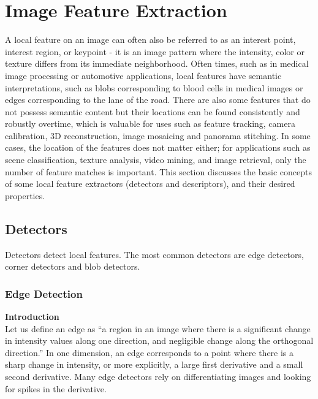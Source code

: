 \documentclass[twoside]{article}
\begin{document}



\section{Image Feature Extraction}

A local feature on an image can often also be referred to as an interest point, interest region, or keypoint - it is an image pattern where the intensity, color or texture differs from its immediate neighborhood. Often times, such as in medical image processing or automotive applications, local features have semantic interpretations, such as blobs corresponding to blood cells in medical images or edges corresponding to the lane of the road. There are also some features that do not possess semantic content but their locations can be found consistently and robustly overtime, which is valuable for uses such as feature tracking, camera calibration, 3D reconstruction, image mosaicing and panorama stitching. In some cases, the location of the features does not matter either; for applications such as scene classification, texture analysis, video mining, and image retrieval, only the number of feature matches is important. This section discusses the basic concepts of some local feature extractors (detectors and descriptors), and their desired properties.

\subsection{Detectors}
Detectors detect local features. The most common detectors are edge detectors, corner detectors and blob detectors.
\subsubsection{Edge Detection}
\textbf{Introduction}\\
Let us define an edge as ``a region in an image where there is a significant change in intensity values along one direction, and negligible change along the orthogonal direction.'' In one dimension, an edge corresponds to a point where there is a sharp change in intensity, or more explicitly, a large first derivative and a small second derivative. Many edge detectors rely on differentiating images and looking for spikes in the derivative.
\end{document}
